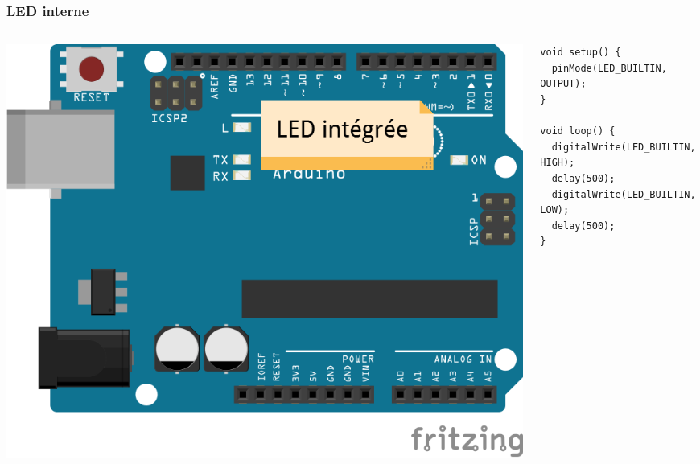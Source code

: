 \documentclass[aspectratio=169,utf8,french]{beamer}
\begin{document}
\begin{frame}[fragile]
  \frametitle{LED interne}
  \begin{columns}
    \begin{column}{.5\linewidth}
      \includegraphics[width=\linewidth]{pictures/UNO-integratedLED_bb.png}
    \end{column}
    \pause
    \begin{column}{.5\linewidth}
      \begin{lstlisting}
void setup() {
  pinMode(LED_BUILTIN, OUTPUT);
}

void loop() {
  digitalWrite(LED_BUILTIN, HIGH);
  delay(500);
  digitalWrite(LED_BUILTIN, LOW);
  delay(500);
}
      \end{lstlisting}
    \end{column}
  \end{columns}
\end{frame}
\end{document}
